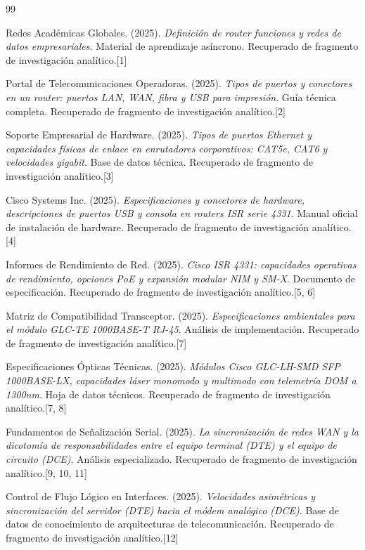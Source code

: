 \documentclass[a4paper,12pt]{article}
\begin{document}
\begin{thebibliography}{99}

Redes Académicas Globales. (2025). \textit{Definición de router funciones y redes de datos empresariales}. Material de aprendizaje asíncrono. Recuperado de fragmento de investigación analítico.[1]

Portal de Telecomunicaciones Operadoras. (2025). \textit{Tipos de puertos y conectores en un router: puertos LAN, WAN, fibra y USB para impresión}. Guía técnica completa. Recuperado de fragmento de investigación analítico.[2]

Soporte Empresarial de Hardware. (2025). \textit{Tipos de puertos Ethernet y capacidades físicas de enlace en enrutadores corporativos: CAT5e, CAT6 y velocidades gigabit}. Base de datos técnica. Recuperado de fragmento de investigación analítico.[3]

Cisco Systems Inc. (2025). \textit{Especificaciones y conectores de hardware, descripciones de puertos USB y consola en routers ISR serie 4331}. Manual oficial de instalación de hardware. Recuperado de fragmento de investigación analítico.[4]

Informes de Rendimiento de Red. (2025). \textit{Cisco ISR 4331: capacidades operativas de rendimiento, opciones PoE y expansión modular NIM y SM-X}. Documento de especificación. Recuperado de fragmento de investigación analítico.[5, 6]

Matriz de Compatibilidad Transceptor. (2025). \textit{Especificaciones ambientales para el módulo GLC-TE 1000BASE-T RJ-45}. Análisis de implementación. Recuperado de fragmento de investigación analítico.[7]

Especificaciones Ópticas Técnicas. (2025). \textit{Módulos Cisco GLC-LH-SMD SFP 1000BASE-LX, capacidades láser monomodo y multimodo con telemetría DOM a 1300nm}. Hoja de datos técnicos. Recuperado de fragmento de investigación analítico.[7, 8]

Fundamentos de Señalización Serial. (2025). \textit{La sincronización de redes WAN y la dicotomía de responsabilidades entre el equipo terminal (DTE) y el equipo de circuito (DCE)}. Análisis especializado. Recuperado de fragmento de investigación analítico.[9, 10, 11]

Control de Flujo Lógico en Interfaces. (2025). \textit{Velocidades asimétricas y sincronización del servidor (DTE) hacia el módem analógico (DCE)}. Base de datos de conocimiento de arquitecturas de telecomunicación. Recuperado de fragmento de investigación analítico.[12]


\end{thebibliography}
\end{document}
